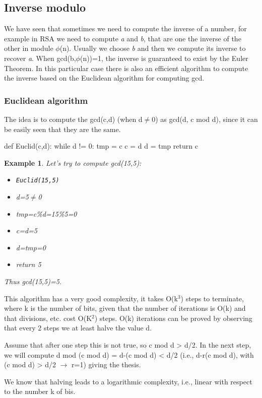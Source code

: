\documentclass[a4paper, 12pt]{report}
\newtheorem{example}{\textbf{Example}}
\begin{document}
\subsection*{Inverse modulo}
We have seen that sometimes we need to compute the inverse of a number, for example in RSA we need to compute \textit{a} and \textit{b}, that are one the inverse of the other in module $\phi$(n). Usually we choose \textit{b} and then we compute its inverse to recover \textit{a}. When gcd(b,$\phi$(n))=1, the inverse is guaranteed to exist by the Euler Theorem. In this particular case there is also an efficient algorithm to compute the inverse based on the Euclidean algorithm for computing gcd. 

\subsubsection{Euclidean algorithm}
The idea is to compute the gcd(c,d) (when d$\ne$0) as gcd(d, c mod d), since it can be easily seen that they are the same.

\begin{python}
def Euclid(c,d):
	while d != 0:
		tmp = c %
		c = d
		d = tmp
	return c
\end{python}

\begin{example}
	Let's try to compute gcd(15,5):
	\begin{itemize}
		\item \texttt{Euclid(15,5)}
		\item d=5$\ne$0
		\item tmp=c\%d=15\%5=0
		\item c=d=5
		\item d=tmp=0
		\item return 5
	\end{itemize}
	Thus gcd(15,5)=5.
\end{example}

This algorithm has a very good complexity, it takes O(k$^3$) steps to terminate, where k is the number of bits, given that the number of iterations is O(k) and that divisions, etc. cost O(K$^2$) steps. O(k) iterations can be proved by observing that every 2 steps we at least halve the value d.

Assume that after one step this is not true, so c mod d > d/2. In the next step, we will compute d mod (c mod d) = d-(c mod d) < d/2 (i.e., d-r(c mod d), with (c mod d) > d/2 $\rightarrow$ r=1) giving the thesis.

We know that halving leads to a logarithmic complexity, i.e., linear with respect to the number k of bis.
\end{document}
